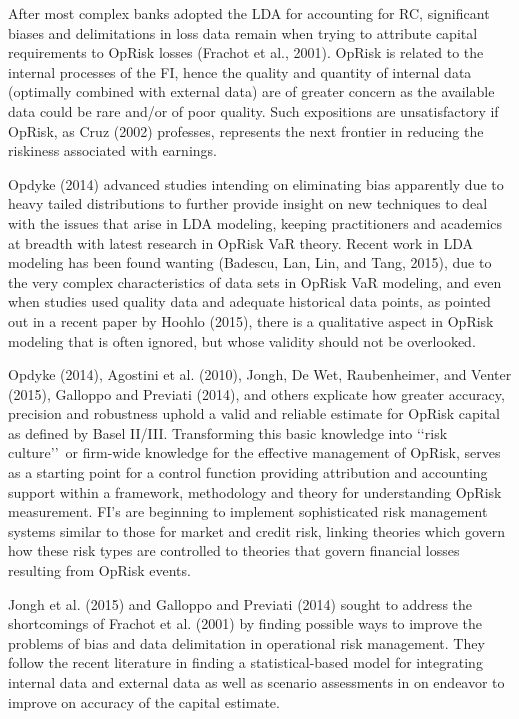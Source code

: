 \documentclass[]{DissertateUSU}
\begin{document}
After most complex banks adopted the LDA for accounting for RC,
significant biases and delimitations in loss data remain when trying to
attribute capital requirements to OpRisk losses (Frachot et al., 2001).
OpRisk is related to the internal processes of the FI, hence the quality
and quantity of internal data (optimally combined with external data)
are of greater concern as the available data could be rare and/or of
poor quality. Such expositions are unsatisfactory if OpRisk, as Cruz
(2002) professes, represents the next frontier in reducing the riskiness
associated with earnings.

Opdyke (2014) advanced studies intending on eliminating bias apparently
due to heavy tailed distributions to further provide insight on new
techniques to deal with the issues that arise in LDA modeling, keeping
practitioners and academics at breadth with latest research in OpRisk
VaR theory. Recent work in LDA modeling has been found wanting (Badescu,
Lan, Lin, and Tang, 2015), due to the very complex characteristics of
data sets in OpRisk VaR modeling, and even when studies used quality
data and adequate historical data points, as pointed out in a recent
paper by Hoohlo (2015), there is a qualitative aspect in OpRisk modeling
that is often ignored, but whose validity should not be overlooked.
\medskip

Opdyke (2014), Agostini et al. (2010), Jongh, De Wet, Raubenheimer, and
Venter (2015), Galloppo and Previati (2014), and others explicate how
greater accuracy, precision and robustness uphold a valid and reliable
estimate for OpRisk capital as defined by Basel II/III. Transforming
this basic knowledge into \lq\lq risk culture\rq\rq~or firm-wide
knowledge for the effective management of OpRisk, serves as a starting
point for a control function providing attribution and accounting
support within a framework, methodology and theory for understanding
OpRisk measurement. FI's are beginning to implement sophisticated risk
management systems similar to those for market and credit risk, linking
theories which govern how these risk types are controlled to theories
that govern financial losses resulting from OpRisk events. \medskip

Jongh et al. (2015) and Galloppo and Previati (2014) sought to address
the shortcomings of Frachot et al. (2001) by finding possible ways to
improve the problems of bias and data delimitation in operational risk
management. They follow the recent literature in finding a
statistical-based model for integrating internal data and external data
as well as scenario assessments in on endeavor to improve on accuracy of
the capital estimate.
\end{document}
